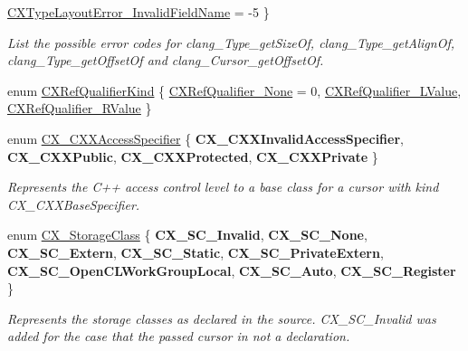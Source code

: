 \begin{DoxyCompactItemize}
\newline
\hyperlink{group__CINDEX__TYPES_ggaaf1b95e9e7e792a08654563fef7502c1abed9d9641401ced4cd5e2ef9f31ad204}{C\+X\+Type\+Layout\+Error\+\_\+\+Invalid\+Field\+Name} = -\/5
 \}\begin{DoxyCompactList}\small\item\em List the possible error codes for {\ttfamily clang\+\_\+\+Type\+\_\+get\+Size\+Of}, {\ttfamily clang\+\_\+\+Type\+\_\+get\+Align\+Of}, {\ttfamily clang\+\_\+\+Type\+\_\+get\+Offset\+Of} and {\ttfamily clang\+\_\+\+Cursor\+\_\+get\+Offset\+Of}. \end{DoxyCompactList}
\item 
enum \hyperlink{group__CINDEX__TYPES_ga28389bbe03a77eded92086f0011d86eb}{C\+X\+Ref\+Qualifier\+Kind} \{ \hyperlink{group__CINDEX__TYPES_gga28389bbe03a77eded92086f0011d86eba9d740e1eb2e30202f534a6d52e92b5bb}{C\+X\+Ref\+Qualifier\+\_\+\+None} = 0, 
\hyperlink{group__CINDEX__TYPES_gga28389bbe03a77eded92086f0011d86eba49ef0f85293bf264e6a546511a207426}{C\+X\+Ref\+Qualifier\+\_\+\+L\+Value}, 
\hyperlink{group__CINDEX__TYPES_gga28389bbe03a77eded92086f0011d86ebab8e1f464c24e64fab52070341f02a9a0}{C\+X\+Ref\+Qualifier\+\_\+\+R\+Value}
 \}
\item 
\mbox{\label{group__CINDEX__TYPES_ga26763f9b0b167116c047e2ef4f221c5f}} 
enum \hyperlink{group__CINDEX__TYPES_ga26763f9b0b167116c047e2ef4f221c5f}{C\+X\+\_\+\+C\+X\+X\+Access\+Specifier} \{ {\bfseries C\+X\+\_\+\+C\+X\+X\+Invalid\+Access\+Specifier}, 
{\bfseries C\+X\+\_\+\+C\+X\+X\+Public}, 
{\bfseries C\+X\+\_\+\+C\+X\+X\+Protected}, 
{\bfseries C\+X\+\_\+\+C\+X\+X\+Private}
 \}\begin{DoxyCompactList}\small\item\em Represents the C++ access control level to a base class for a cursor with kind C\+X\+\_\+\+C\+X\+X\+Base\+Specifier. \end{DoxyCompactList}
\item 
\mbox{\label{group__CINDEX__TYPES_ga03a15eaa53465d7f3ce7d88743241d7e}} 
enum \hyperlink{group__CINDEX__TYPES_ga03a15eaa53465d7f3ce7d88743241d7e}{C\+X\+\_\+\+Storage\+Class} \{ \newline
{\bfseries C\+X\+\_\+\+S\+C\+\_\+\+Invalid}, 
{\bfseries C\+X\+\_\+\+S\+C\+\_\+\+None}, 
{\bfseries C\+X\+\_\+\+S\+C\+\_\+\+Extern}, 
{\bfseries C\+X\+\_\+\+S\+C\+\_\+\+Static}, 
\newline
{\bfseries C\+X\+\_\+\+S\+C\+\_\+\+Private\+Extern}, 
{\bfseries C\+X\+\_\+\+S\+C\+\_\+\+Open\+C\+L\+Work\+Group\+Local}, 
{\bfseries C\+X\+\_\+\+S\+C\+\_\+\+Auto}, 
{\bfseries C\+X\+\_\+\+S\+C\+\_\+\+Register}
 \}\begin{DoxyCompactList}\small\item\em Represents the storage classes as declared in the source. C\+X\+\_\+\+S\+C\+\_\+\+Invalid was added for the case that the passed cursor in not a declaration. \end{DoxyCompactList}
\end{DoxyCompactItemize}

